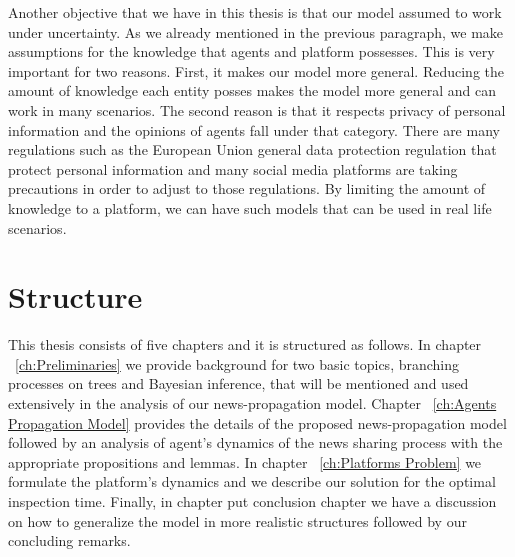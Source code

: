 Another objective that we have in this thesis is that our model assumed to work under uncertainty. As we already mentioned in the previous paragraph, we make assumptions for the knowledge that agents and platform possesses. This is very important for two reasons. First, it makes our model more general. Reducing the amount of knowledge each entity posses makes the model more general and can work in many scenarios. The second reason is that it respects privacy of personal information and the opinions of agents fall under that category. There are many regulations such as the European Union general data protection regulation that protect personal information and many social media platforms are taking precautions in order to adjust to those regulations. By limiting the amount of knowledge to a platform, we can have such models that can be used in real life scenarios.



\section{Structure}
\label{sec:Structure}
This thesis consists of five chapters and it is structured as follows. In chapter ~\ref{ch:Preliminaries} we provide background for two basic topics, branching processes on trees and Bayesian inference, that will be mentioned and used extensively in the analysis of our news-propagation model. Chapter ~\ref{ch:Agents Propagation Model}  provides the details of the proposed news-propagation model followed by an analysis of agent's dynamics of the news sharing process with the appropriate propositions and lemmas. In chapter ~\ref{ch:Platforms Problem} we formulate the platform's dynamics and we describe our solution for the optimal inspection time. Finally, in chapter {put conclusion chapter} we have a discussion on how to generalize the model in more realistic structures followed by our concluding remarks.